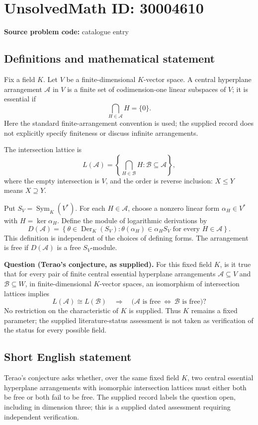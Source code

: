 \documentclass[11pt]{article}
\begin{document}
\section*{UnsolvedMath ID: 30004610}
\textbf{Source problem code:} catalogue entry
\subsection{Definitions and mathematical statement}
Fix a field \(K\). Let \(V\) be a finite-dimensional \(K\)-vector space. A central hyperplane arrangement \(\mathcal A\) in \(V\) is a finite set of codimension-one linear subspaces of \(V\); it is essential if
\[
\bigcap_{H\in\mathcal A}H=\{0\}.
\]
Here the standard finite-arrangement convention is used; the supplied record does not explicitly specify finiteness or discuss infinite arrangements.

The intersection lattice is
\[
L(\mathcal A)=\left\{\bigcap_{H\in\mathcal B}H:\mathcal B\subseteq\mathcal A\right\},
\]
where the empty intersection is \(V\), and the order is reverse inclusion: \(X\leq Y\) means \(X\supseteq Y\).

Put \(S_V=\operatorname{Sym}_K(V^*)\). For each \(H\in\mathcal A\), choose a nonzero linear form \(\alpha_H\in V^*\) with \(H=\ker\alpha_H\). Define the module of logarithmic derivations by
\[
D(\mathcal A)=\left\{\theta\in\operatorname{Der}_K(S_V):\theta(\alpha_H)\in\alpha_H S_V\text{ for every }H\in\mathcal A\right\}.
\]
This definition is independent of the choices of defining forms. The arrangement is free if \(D(\mathcal A)\) is a free \(S_V\)-module.

\textbf{Question (Terao's conjecture, as supplied).} For this fixed field \(K\), is it true that for every pair of finite central essential hyperplane arrangements \(\mathcal A\subseteq V\) and \(\mathcal B\subseteq W\), in finite-dimensional \(K\)-vector spaces, an isomorphism of intersection lattices implies
\[
L(\mathcal A)\cong L(\mathcal B)
\quad\Longrightarrow\quad
\bigl(\mathcal A\text{ is free}\ \Longleftrightarrow\ \mathcal B\text{ is free}\bigr)?
\]
No restriction on the characteristic of \(K\) is supplied. Thus \(K\) remains a fixed parameter; the supplied literature-status assessment is not taken as verification of the status for every possible field.
\subsection{Short English statement}
Terao's conjecture asks whether, over the same fixed field \(K\), two central essential hyperplane arrangements with isomorphic intersection lattices must either both be free or both fail to be free. The supplied record labels the question open, including in dimension three; this is a supplied dated assessment requiring independent verification.
\end{document}
